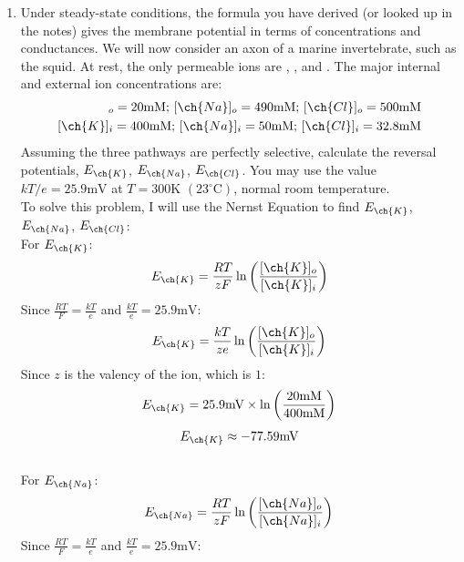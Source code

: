 \documentclass[11pt]{article}
\begin{document}
\begin{enumerate}[label=\arabic*.]
\begin{enumerate}[label=\alph*.]
\newpage
\item
Under steady-state conditions, the formula you have derived (or looked up in the notes) gives the membrane potential in terms of concentrations and conductances. We will now consider an axon of a marine invertebrate, such as the squid. At rest, the only permeable ions are , , and . The major internal and external ion concentrations are:
\begin{align*}
[\ch{K}]_o = 20 \text{mM}\text{; }[\ch{Na}]_o = 490 \text{mM}\text{; }[\ch{Cl}]_o = 500 \text{mM} \\
[\ch{K}]_i = 400 \text{mM}\text{; }[\ch{Na}]_i = 50 \text{mM}\text{; }[\ch{Cl}]_i = 32.8 \text{mM}
\end{align*}
Assuming the three pathways are perfectly selective, calculate the reversal potentials, $E_{\ch{K}}$, $E_{\ch{Na}}$, $E_{\ch{Cl}}$. You may use the value $k T/e = 25.9 \text{mV}$ at $T =300 \text{K}$ $\left(23 ^{\circ}\text{C}\right)$, normal room temperature.
\vspace*{1\baselineskip}
\\
To solve this problem, I will use the Nernst Equation to find $E_{\ch{K}}$, $E_{\ch{Na}}$, $E_{\ch{Cl}}$:
\vspace*{1\baselineskip}
\\
For $E_{\ch{K}}$:
\begin{align*}
E_{\ch{K}} = \frac{R T} {z F} \ln{\left(\frac{[\ch{K}]_o} {[\ch{K}]_i}\right)}
\end{align*}
Since $\frac{R T} {F} = \frac{k T} {e}$ and $\frac{k T} {e} = 25.9 \text{mV}$:
\begin{align*}
E_{\ch{K}} = \frac{k T} {ze} \ln{\left(\frac{[\ch{K}]_o} {[\ch{K}]_i}\right)}
\end{align*}
Since $z$ is the valency of the  ion, which is $1$:
\begin{align*}
E_{\ch{K}} = 25.9 \text{mV} \times \ln{\left(\frac{20 \text{mM}} {400 \text{mM}}\right)}
\end{align*}
\begin{align*}
E_{\ch{K}} \approx -77.59 \text{mV}
\end{align*}
\vspace*{1\baselineskip}
\\
For $E_{\ch{Na}}$:
\begin{align*}
E_{\ch{Na}} = \frac{R T} {z F} \ln{\left(\frac{[\ch{Na}]_o} {[\ch{Na}]_i}\right)}
\end{align*}
Since $\frac{R T} {F} = \frac{k T} {e}$ and $\frac{k T} {e} = 25.9 \text{mV}$:

\end{enumerate}
\end{enumerate}
\end{document}
